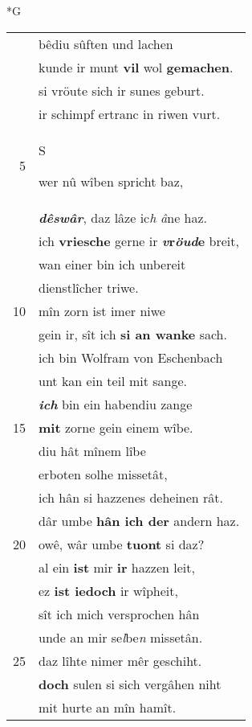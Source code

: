 \documentclass[8pt,a4paper,notitlepage]{article}
\begin{document}
\newpage
\begin{table}[ht]
\begin{minipage}[t]{0.5\linewidth}
\small
\begin{center}*G
\end{center}
\begin{tabular}{rl}
 & bêdiu sûften und lachen\\ 
 & kunde ir munt \textbf{vil} wol \textbf{gemachen}.\\ 
 & si vröute sich ir sunes geburt.\\ 
 & ir schimpf ertranc in riwen vurt.\\ 
5 & \begin{large}S\end{large}wer nû wîben spricht baz,\\ 
 & \textit{\textbf{dêswâr}}, daz lâze ic\textit{h â}ne haz.\\ 
 & ich \textbf{vriesche} gerne ir \textbf{\textit{v}r\textit{öud}e} breit,\\ 
 & wan einer bin ich unbereit\\ 
 & dienstlîcher triwe.\\ 
10 & mîn zorn ist imer niwe\\ 
 & gein ir, sît ich \textbf{si an wanke} sach.\\ 
 & ich bin Wolfram von Eschenbach\\ 
 & unt kan ein teil mit sange.\\ 
 & \textit{\textbf{ich}} bin ein habendiu zange\\ 
15 & \textbf{mit} zorne gein einem wîbe.\\ 
 & diu hât mînem lîbe\\ 
 & erboten solhe missetât,\\ 
 & ich hân si hazzenes deheinen rât.\\ 
 & dâr umbe \textbf{hân ich der} andern haz.\\ 
20 & owê, wâr umbe \textbf{tuont} si daz?\\ 
 & al ein \textbf{ist} mir \textbf{ir} hazzen leit,\\ 
 & ez \textbf{ist iedoch} ir wîpheit,\\ 
 & sît ich mich versprochen hân\\ 
 & unde an mir se\textit{l}be\textit{n} missetân.\\ 
25 & daz lîhte nimer mêr geschiht.\\ 
 & \textbf{doch} sulen si sich vergâhen niht\\ 
 & mit hurte an mîn hamît.\\ 

\end{tabular}
\end{minipage}
\end{table}
\end{document}
